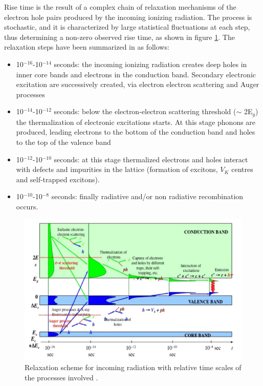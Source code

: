 Rise time is the result of a complex chain of relaxation mechanisms of the electron hole pairs produced by the incoming ionizing radiation. The process is stochastic, and it is characterized by large statistical fluctuations at each step, thus determining a non-zero observed rise time, as shown in figure \ref{fig:chain}.
The relaxation steps have been summarized in \cite{Lecoq2014} as follows:
\begin{itemize}
\item 10$^{-16}$-10$^{-14}$ seconds: the incoming ionizing radiation creates deep holes in inner core bands and electrons in the conduction band. Secondary electronic excitation are successively created, via electron electron scattering and Auger processes
\item 10$^{-14}$-10$^{-12}$ seconds: below the electron-electron scattering threshold ($\sim$ 2E$_{g}$) the thermalization of electronic excitations starts. At this stage phonons are produced, leading electrons to the bottom of the conduction band and holes to the top of the valence band
\item 10$^{-12}$-10$^{-10}$ seconds: at this stage thermalized electrons and holes interact with defects and impurities in the lattice (formation of excitons, $V _{K}$ centres and self-trapped excitons). 
\item 10$^{-10}$-10$^{-8}$ seconds: finally radiative and/or non radiative recombination occurs.
\end{itemize}
\begin{figure}[htbp]
\begin{center}
\includegraphics[width=14cm]{../Pictures/Chapter_4/chain.png}
\end{center}
\caption[Relaxation of electron and holes]{Relaxation scheme for incoming radiation with relative time scales of the processes involved \cite{Lecoq2014}.}
\label{fig:chain}
\end{figure}

